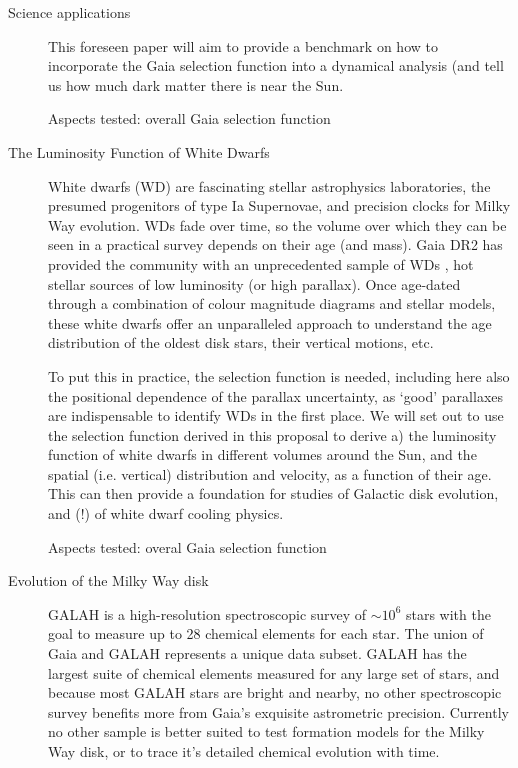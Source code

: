 \begin{workpackage}{Science applications}
\begin{wpobjectives}
\begin{description}
{        This foreseen paper will aim  to provide a benchmark on how to incorporate the Gaia selection function into a dynamical analysis (and tell us how much dark matter there is near the Sun.
        
        \textsf{Aspects tested: overall Gaia selection function}    
    }
      
    \item[The Luminosity Function of White Dwarfs]{
        White dwarfs (WD) are fascinating stellar astrophysics laboratories, the presumed progenitors of type Ia Supernovae, and precision clocks for Milky Way evolution. WDs fade over time, so the volume over which they can be seen in a practical survey depends on their age (and mass). Gaia DR2 has provided the community with an unprecedented sample of WDs \citep{WD_DR2}, hot stellar sources of low luminosity (or high parallax). Once age-dated through a combination of colour magnitude diagrams and stellar models, these white dwarfs offer an unparalleled approach to understand the age distribution of the oldest disk stars, their vertical motions, etc.
      
        To put this in practice, the selection function is needed, including here also the positional dependence of the parallax uncertainty, as `good' parallaxes are indispensable to identify WDs in the first place. We will set out to use the selection function derived in this proposal to derive a) the luminosity function of white dwarfs in different volumes around the Sun, and the spatial (i.e. vertical) distribution and velocity, as a function of their age. This can then provide a foundation for studies of Galactic disk evolution, and (!) of white dwarf cooling physics.
        
        \textsf{Aspects tested: overal Gaia selection function}
    }
      
     \item[Evolution of the Milky Way disk]
        {GALAH is a high-resolution spectroscopic survey of $\sim10^6$ stars with the goal to measure up to 28 chemical elements for each star. The union of Gaia and GALAH represents a unique data subset. GALAH has the largest suite of chemical elements measured for any large set of stars, and because most GALAH stars are bright and nearby, no other spectroscopic survey benefits more from Gaia's exquisite astrometric precision. Currently no other sample is better suited to test formation models for the Milky Way disk, or to trace it's detailed chemical evolution with time.
      
}
\end{description}
\end{wpobjectives}
\end{workpackage}
